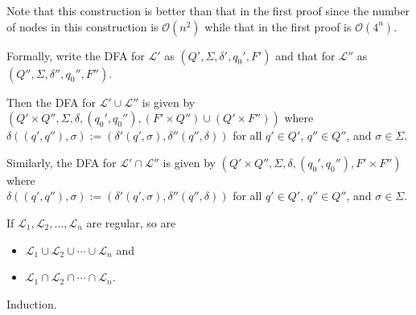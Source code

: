 \documentclass{notes}
\begin{document}
\begin{prf}
\begin{minipage}{0.45 \textwidth}
\begin{center}
{
      }
    \end{center}
  \end{minipage}
  \vspace{0.5 \baselineskip}
  
  Note that this construction is better than that in the first proof since the number of nodes in this construction is $\mathcal O(n^2)$ while that in the first proof is $\mathcal O(4^n)$.
  
  Formally, write the DFA for $\mathcal L'$ as $(Q', \Sigma, \delta', q_0', F')$ and that for $\mathcal L''$ as $(Q'', \Sigma, \delta'', q_0'', F'')$.
  
  Then the DFA for $\mathcal L' \cup \mathcal L''$ is given by $(Q' \times Q'', \Sigma, \delta, (q_0', q_0''), (F' \times Q'') \cup (Q' \times F''))$ where $\delta((q', q''), \sigma) := (\delta'(q', \sigma), \delta''(q'', \delta))$ for all $q' \in Q'$, $q'' \in Q''$, and $\sigma \in \Sigma$.

  Similarly, the DFA for $\mathcal L' \cap \mathcal L''$ is given by $(Q' \times Q'', \Sigma, \delta, (q_0', q_0''), F' \times F'')$ where \\ $\delta((q', q''), \sigma) := (\delta'(q', \sigma), \delta''(q'', \delta))$ for all $q' \in Q'$, $q'' \in Q''$, and $\sigma \in \Sigma$.
\end{prf}

\begin{cor}
  If $\mathcal L_1, \mathcal L_2, \dots, \mathcal L_n$ are regular, so are 
  \begin{itemize}
    \item $\mathcal L_1 \cup \mathcal L_2 \cup \cdots \cup \mathcal L_n$ and 

    \item $\mathcal L_1 \cap \mathcal L_2 \cap \cdots \cap \mathcal L_n$.
  \end{itemize}
\end{cor}

\begin{prf}
  Induction.
\end{prf}
\end{document}
